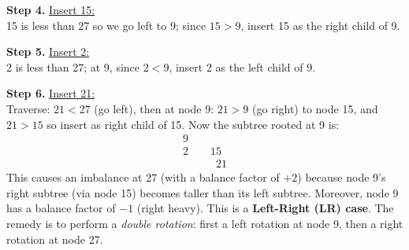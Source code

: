 \documentclass[11pt]{article}
\begin{document}
\begin{center}
\end{center}

\textbf{Step 4.} \underline{Insert 15:}\\[2mm]
15 is less than 27 so we go left to 9; since $15>9$, insert 15 as the right child of 9.


\begin{center}
\end{center}

\textbf{Step 5.} \underline{Insert 2:}\\[2mm]
2 is less than 27; at 9, since $2<9$, insert 2 as the left child of 9.


\begin{center}
\end{center}

\textbf{Step 6.} \underline{Insert 21:}\\[2mm]
Traverse: $21<27$ (go left), then at node 9: $21>9$ (go right) to node 15, and $21>15$ so insert as right child of 15.
Now the subtree rooted at 9 is:
\[
    \begin{array}{c}
        9               \\[2mm]
        2 \quad\quad 15 \\[2mm]
        \qquad\quad 21
    \end{array}
\]
This causes an imbalance at 27 (with a balance factor of $+2$) because node 9’s right subtree (via node 15) becomes taller than its left subtree. Moreover, node 9 has a balance factor of \(-1\) (right heavy). This is a \textbf{Left-Right (LR) case}. The remedy is to perform a \emph{double rotation}: first a left rotation at node 9, then a right rotation at node 27.
\end{document}

